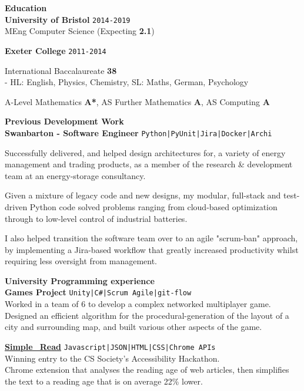 \documentclass[10pt]{article}
\newcommand{\bold}[1]{\textbf{\textcolor{dark}{#1}}}
\newcommand{\sect}[1]{
\vspace{0.4em} {\LARGE\bold{#1}}\vspace{0.2em}\\}
\newcommand{\zz}[3]{
{\large\bold{#1}} \hfill 
{\small \colorbox{light}{\texttt{#3}}}\\
{#2}\vspace{0.6em}}
\newcommand{\li}{\textcolor{mid}{|}}
\begin{document}
\begin{minipage}[t]{0.65\textwidth}
\raggedright

\vspace{-1.2em}
\sect{Education}
\zz{University of Bristol}
{MEng Computer Science \small{(Expecting \bold{2.1})}}{2014-2019}

\zz{Exeter College}
{International Baccalaureate \bold{38} \\  
\hspace{1em} {\small - HL: English, Physics, Chemistry, SL: Maths, German, Psychology}

\vspace{0.2em}
A-Level Mathematics \bold{A*}, AS Further Mathematics \bold{A}, AS Computing \bold{A}}
{2011-2014}



\sect{Previous Development Work}

\zz{Swanbarton - Software Engineer}
{Successfully delivered, and helped design architectures for, a variety of energy management and trading products, as a member of the research \& development team at an energy-storage consultancy.

Given a mixture of legacy code and new designs, my modular, full-stack and test-driven Python code solved problems ranging from cloud-based optimization through to low-level control of industrial batteries.

I also helped transition the software team over to an agile "scrum-ban" approach, by implementing a Jira-based workflow that greatly increased productivity whilst requiring less oversight from management.}
{Python\li PyUnit\li Jira\li Docker\li Archi}




\sect{University Programming experience}

\zz{Games Project}
{Worked in a team of 6 to develop a complex networked multiplayer game.\\
Designed an efficient algorithm for the procedural-generation of the layout of a city and surrounding map, and built various other aspects of the game.}
{Unity\li C\#\li Scrum Agile\li git-flow}

\zz{\href{https://lukestorry.co.uk/simple_read/}{Simple\_Read}}
{Winning entry to the CS Society's Accessibility Hackathon.\\
Chrome extension that analyses the reading age of web articles, then simplifies the text to a reading age that is on average 22\% lower.}{Javascript\li JSON\li HTML\li CSS\li Chrome APIs}


\end{minipage}
\end{document}
